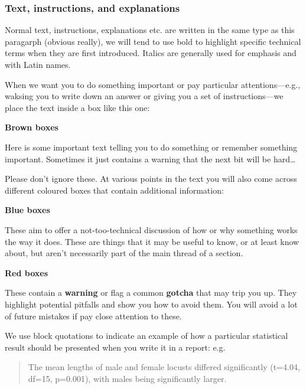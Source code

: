 \documentclass[]{book}
\begin{document}
\subsubsection{Text, instructions, and
explanations}\label{text-instructions-and-explanations}

Normal text, instructions, explanations etc. are written in the same
type as this paragarph (obvious really), we will tend to use bold to
highlight specific technical terms when they are first introduced.
Italics are generally used for emphasis and with Latin names.

When we want you to do something important or pay particular
attentions---e.g., waksing you to write down an answer or giving you a
set of instructions---we place the text inside a box like this one:

\begin{do-something}
\textbf{Brown boxes}

Here is some important text telling you to do something or remember
something important. Sometimes it just contains a warning that the next
bit will be hard\ldots{}
\end{do-something}

Please don't ignore these. At various points in the text you will also
come across different coloured boxes that contain additional
information:

\begin{advanced-box}
\textbf{Blue boxes}

These aim to offer a not-too-technical discussion of how or why
something works the way it does. These are things that it may be useful
to know, or at least know about, but aren't necessarily part of the main
thread of a section.
\end{advanced-box}

\begin{warning-box}
\textbf{Red boxes}

These contain a \textbf{warning} or flag a common \textbf{gotcha} that
may trip you up. They highlight potential pitfalls and show you how to
avoid them. You will avoid a lot of future mistakes if pay close
attention to these.
\end{warning-box}

We use block quotations to indicate an example of how a particular
statistical result should be presented when you write it in a report:
e.g.

\begin{quote}
The mean lengths of male and female locusts differed significantly
(t=4.04, df=15, p=0.001), with males being significantly larger.
\end{quote}
\end{document}
